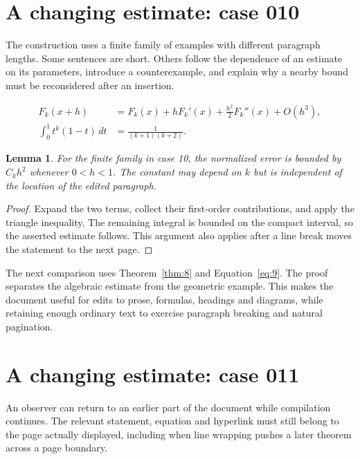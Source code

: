 \documentclass[a4paper,10pt]{article}
\newtheorem{lemma}[theorem]{Lemma}
\begin{document}
\lipsum[18]

\section{A changing estimate: case 010}\label{unit:9}
The construction uses a finite family of examples with different paragraph lengths. Some sentences are short. Others follow the dependence of an estimate on its parameters, introduce a counterexample, and explain why a nearby bound must be reconsidered after an insertion.

\lipsum[28-29]
\begin{align}\label{eq:9}
 F_k(x+h)&=F_k(x)+hF_k'(x)+\frac{h^2}{2}F_k''(x)+O(h^3),\\
 \int_0^1 t^k(1-t)\,dt&=\frac{1}{(k+1)(k+2)}.
\end{align}
\begin{lemma}\label{thm:9}
For the finite family in case 10, the normalized error is bounded by $C_k h^2$ whenever $0<h<1$. The constant may depend on $k$ but is independent of the location of the edited paragraph.
\end{lemma}
\begin{proof}
Expand the two terms, collect their first-order contributions, and apply the
triangle inequality. The remaining integral is bounded on the compact interval,
so the asserted estimate follows. This argument also applies after a line break
moves the statement to the next page.
\end{proof}
\begin{center}
\end{center}
The next comparison uses Theorem~\ref{thm:8} and Equation~\ref{eq:9}. The proof separates the algebraic estimate from the geometric example. This makes the document useful for edits to prose, formulas, headings and diagrams, while retaining enough ordinary text to exercise paragraph breaking and natural pagination.

\lipsum[23]

\section{A changing estimate: case 011}\label{unit:10}
An observer can return to an earlier part of the document while compilation continues. The relevant statement, equation and hyperlink must still belong to the page actually displayed, including when line wrapping pushes a later theorem across a page boundary.
\end{document}
